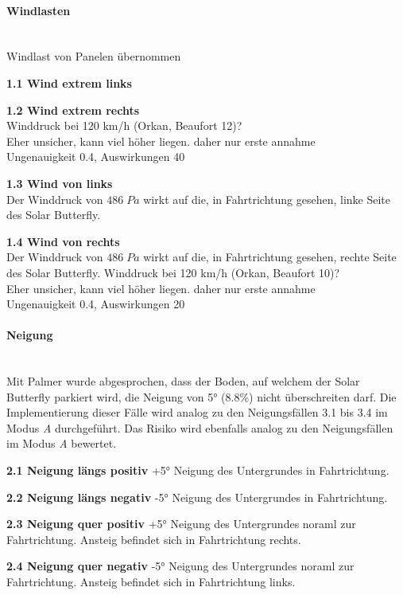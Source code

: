 \paragraph{Windlasten}\mbox{}\\
Windlast von Panelen übernommen
\begin{description}
  \item \textbf{1.1 Wind extrem links}\\
  \item \textbf{1.2 Wind extrem rechts}\\
  Winddruck bei 120 km/h (Orkan, Beaufort 12)?\\
  Eher unsicher, kann viel höher liegen. daher nur erste annahme\\
  Ungenauigkeit 0.4, Auswirkungen 40
  \item \textbf{1.3 Wind von links}\\ Der Winddruck von $486 \; Pa$ wirkt auf die, in Fahrtrichtung gesehen, linke Seite des Solar Butterfly.
  \item \textbf{1.4 Wind von rechts}\\ Der Winddruck von $486 \; Pa$ wirkt auf die, in Fahrtrichtung gesehen, rechte Seite des Solar Butterfly.
  Winddruck bei 120 km/h (Orkan, Beaufort 10)?\\
  Eher unsicher, kann viel höher liegen. daher nur erste annahme\\
  Ungenauigkeit 0.4, Auswirkungen 20
\end{description}

\paragraph{Neigung}\mbox{}\\
Mit Palmer wurde abgesprochen, dass der Boden, auf welchem der Solar Butterfly parkiert wird, die Neigung von 5° (8.8\%) nicht überschreiten darf. Die Implementierung dieser Fälle wird analog zu den Neigungsfällen 3.1 bis 3.4 im Modus \emph{A} durchgeführt. Das Risiko wird ebenfalls analog zu den Neigungsfällen im Modus \emph{A} bewertet.
\begin{description}
  \item \textbf{2.1 Neigung längs positiv} +5° Neigung des Untergrundes in Fahrtrichtung.
  \item \textbf{2.2 Neigung längs negativ} -5° Neigung des Untergrundes in Fahrtrichtung.
  \item \textbf{2.3 Neigung quer positiv} +5° Neigung des Untergrundes noraml zur Fahrtrichtung. Ansteig befindet sich in Fahrtrichtung rechts.
  \item \textbf{2.4 Neigung quer negativ} -5° Neigung des Untergrundes noraml zur Fahrtrichtung. Ansteig befindet sich in Fahrtrichtung links.
\end{description}

